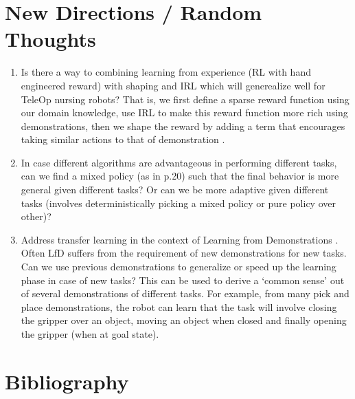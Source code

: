 \documentclass{article}[11pt]
\begin{document}
\section{New Directions / Random Thoughts}
\begin{enumerate}
\item Is there a way to combining learning from experience (RL with hand engineered reward) with shaping and IRL which will generealize well for TeleOp nursing robots? That is, we first define a sparse reward function using our domain knowledge, use IRL to make this reward function more rich using demonstrations, then we shape the reward by adding a term that encourages taking similar actions to that of demonstration \cite{brys2015reinforcement}. 

\item In case different algorithms are advantageous in performing different tasks, can we find a mixed policy (as in \cite{ziebart2010modeling} p.20) such that the final behavior is more general given different tasks? Or can we be more adaptive given different tasks (involves deterministically picking a mixed policy or pure policy over other)? 

\item Address transfer learning in the context of Learning from Demonstrations \cite{chao2011towards, fitzgerald2015skill}. Often LfD suffers from the requirement of new demonstrations for new tasks. Can we use previous demonstrations to generalize or speed up the learning phase in case of new tasks? This can be used to derive a `common sense' out of several demonstrations of different tasks. For example, from many pick and place demonstrations, the robot can learn that the task will involve closing the gripper over an object, moving an object when closed and finally opening the gripper (when at goal state).   
\end{enumerate}

\section{Bibliography}



\end{document}

